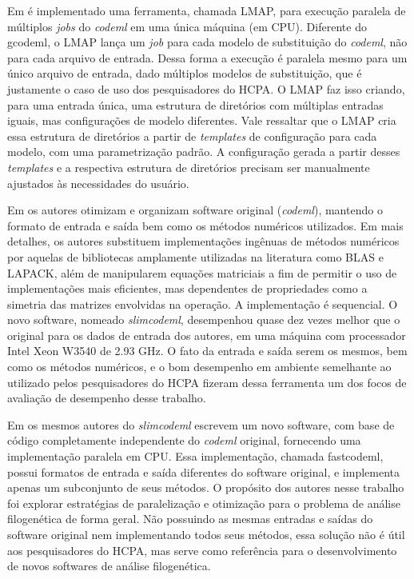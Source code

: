 \documentclass[cic,tc]{iiufrgs}
\begin{document}
Em \cite{maldonado2016lmap} é implementado uma
ferramenta, chamada LMAP, para execução paralela de múltiplos \textit{jobs} do
\textit{codeml} em uma única máquina (em CPU). Diferente do gcodeml, o LMAP lança um
\textit{job} para cada modelo de substituição do \textit{codeml}, não para
cada arquivo de entrada. Dessa forma a execução é paralela mesmo para um único
arquivo de entrada, dado múltiplos modelos de substituição, que é
justamente o caso de uso dos pesquisadores do HCPA. O LMAP faz isso criando,
para uma entrada única, uma estrutura de diretórios com múltiplas entradas
iguais, mas configurações de modelo diferentes. Vale ressaltar que o LMAP cria
essa estrutura de diretórios a partir de \textit{templates} de configuração
para cada modelo, com uma parametrização padrão. A configuração gerada a partir
desses \textit{templates} e a respectiva estrutura de diretórios precisam ser
manualmente ajustados às necessidades do usuário.

Em \cite{schabauer2012slimcodeml} os autores otimizam e organizam software
original (\textit{codeml}), mantendo o formato de entrada e saída bem como os métodos
numéricos utilizados. Em mais detalhes, os autores substituem implementações
ingênuas de métodos numéricos por aquelas de bibliotecas amplamente utilizadas
na literatura como BLAS e LAPACK, além de manipularem equações matriciais a fim
de permitir o uso de implementações mais eficientes, mas dependentes de
propriedades como a simetria das matrizes envolvidas na operação. A
implementação é sequencial. O novo software, nomeado \textit{slimcodeml}, desempenhou
quase dez vezes melhor que o original para os dados de entrada dos autores, em
uma máquina com processador Intel Xeon W3540 de 2.93 GHz. O fato da entrada e
saída serem os mesmos, bem como os métodos numéricos, e o bom desempenho em
ambiente semelhante ao utilizado pelos pesquisadores do HCPA fizeram dessa
ferramenta um dos focos de avaliação de desempenho desse trabalho.

Em \cite{valle2014optimization} os mesmos autores do \textit{slimcodeml} escrevem um
novo software, com base de código completamente independente do \textit{codeml}
original, fornecendo uma implementação paralela em CPU. Essa implementação,
chamada fastcodeml, possui formatos de entrada e saída diferentes do software
original, e implementa apenas um subconjunto de seus métodos. O propósito dos
autores nesse trabalho foi explorar estratégias de paralelização e otimização
para o problema de análise filogenética de forma geral. Não possuindo as mesmas
entradas e saídas do software original nem implementando todos seus métodos,
essa solução não é útil aos pesquisadores do HCPA, mas serve como referência
para o desenvolvimento de novos softwares de análise filogenética.
\end{document}
